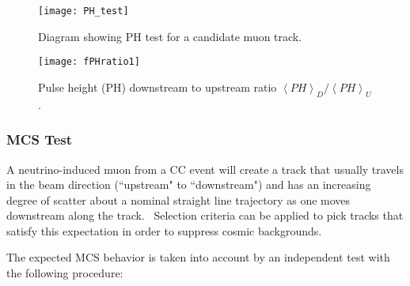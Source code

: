 \documentclass{article}
\begin{document}
\begin{figure}[tbp]
\centering
\texttt{[image: PH\_test]} %
\caption{Diagram showing PH test for a candidate muon track.}
\label{img:PH test}
\end{figure}

\begin{figure}[tbp]
\centering
\texttt{[image: fPHratio1]} %
\caption{Pulse height (PH) downstream to upstream ratio $\left\langle
PH\right\rangle _{D}/\left\langle PH\right\rangle _{U}$.}
\label{img:PH_ratio}
\end{figure}

\subsubsection{MCS Test}

\label{MCS}
A neutrino-induced muon from a CC event will create a track that usually travels in the beam direction (``upstream" to ``downstream") and has an increasing degree of scatter about a nominal straight line trajectory as one moves downstream along the track. \ Selection criteria can be applied to
pick tracks that satisfy this expectation in order to suppress cosmic
backgrounds.

The expected MCS behavior is taken into account by an independent test with the following procedure:
\end{document}
